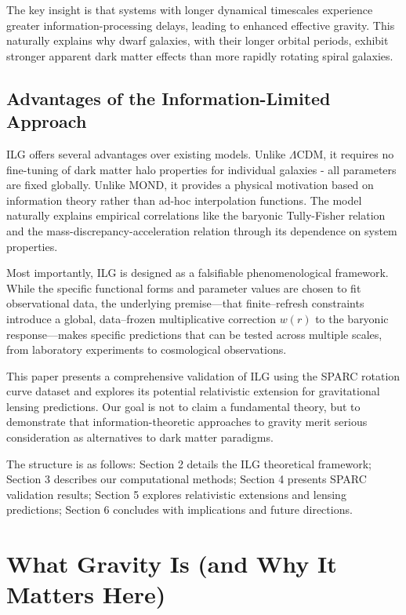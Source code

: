 \documentclass[usenatbib]{mnras}
\begin{document}
The key insight is that systems with longer dynamical timescales experience greater information-processing delays, leading to enhanced effective gravity. This naturally explains why dwarf galaxies, with their longer orbital periods, exhibit stronger apparent dark matter effects than more rapidly rotating spiral galaxies.

\subsection{Advantages of the Information-Limited Approach}

ILG offers several advantages over existing models. Unlike $\Lambda$CDM, it requires no fine-tuning of dark matter halo properties for individual galaxies - all parameters are fixed globally. Unlike MOND, it provides a physical motivation based on information theory rather than ad-hoc interpolation functions. The model naturally explains empirical correlations like the baryonic Tully-Fisher relation and the mass-discrepancy-acceleration relation through its dependence on system properties.

Most importantly, ILG is designed as a falsifiable phenomenological framework. While the specific functional forms and parameter values are chosen to fit observational data, the underlying premise—that finite–refresh constraints introduce a global, data–frozen multiplicative correction $w(r)$ to the baryonic response—makes specific predictions that can be tested across multiple scales, from laboratory experiments to cosmological observations.

This paper presents a comprehensive validation of ILG using the SPARC rotation curve dataset and explores its potential relativistic extension for gravitational lensing predictions. Our goal is not to claim a fundamental theory, but to demonstrate that information-theoretic approaches to gravity merit serious consideration as alternatives to dark matter paradigms.

The structure is as follows: Section 2 details the ILG theoretical framework; Section 3 describes our computational methods; Section 4 presents SPARC validation results; Section 5 explores relativistic extensions and lensing predictions; Section 6 concludes with implications and future directions.


\section{What Gravity Is (and Why It Matters Here)}
\label{sec:what-gravity-is}
\end{document}
